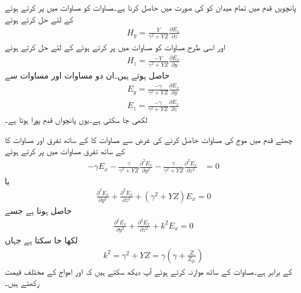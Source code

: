 پانچویں قدم میں تمام میدان کو  کی صورت میں حاصل کرنا ہے۔مساوات  کو مساوات  میں پر کرتے ہوئے   کے لئے حل کرتے ہوئے
\begin{align}
H_y=\frac{Y}{\gamma^2+YZ} \frac{\partial E_x}{\partial z}\label{مساوات_مویج_عرضی_مقناطیسی_برقی_شکل_الف}
\end{align}
اور اسی طرح مساوات  کو مساوات  میں پر کرتے ہوئے   کے لئے حل کرتے ہوئے
\begin{align}
H_z=\frac{-Y}{\gamma^2+YZ} \frac{\partial E_x}{\partial y}\label{مساوات_مویج_عرضی_مقناطیسی_برقی_شکل_ب}
\end{align}
حاصل ہوتے ہیں۔ان دو مساوات اور مساوات  سے 
\begin{align}
E_y=\frac{-\gamma}{\gamma^2+YZ} \frac{\partial E_x}{\partial y} \label{مساوات_مویج_عرضی_مقناطیسی_برقی_شکل_پ}\\
E_z=\frac{-\gamma}{\gamma^2+YZ} \frac{\partial E_x}{\partial z}\label{مساوات_مویج_عرضی_مقناطیسی_برقی_شکل_ت}
\end{align}
لکھی جا سکتی ہے۔یوں پانچواں قدم پورا ہوتا ہے۔

چھٹے قدم میں   موج کی مساوات حاصل کرنے کی غرض سے مساوات  کا  کے ساتھ تفرق اور مساوات  کا  کے ساتھ تفرق مساوات  میں پر کرتے ہوئے  
\begin{align*}
-\gamma E_x-\frac{\gamma}{\gamma^2+YZ}\frac{\partial^2 E_x}{\partial y^2}-\frac{\gamma}{\gamma^2+YZ}\frac{\partial^2 E_x}{\partial z^2}&=0  
\end{align*}
یا
\begin{align*}
\frac{\partial^2 E_x}{\partial y^2}+\frac{\partial^2 E_x}{\partial z^2}+(\gamma^2+YZ)E_x=0  
\end{align*}
حاصل ہوتا ہے جسے
\begin{align}\label{مساوات_مویج_عرضی_مقناطیسی_غیر_سمتی_موج}
\frac{\partial^2 E_x}{\partial y^2}+\frac{\partial^2 E_x}{\partial z^2}+k^2 E_x=0  
\end{align}
لکھا جا سکتا ہے جہاں
\begin{align}\label{مساوات_مویج_عرضی_مقناطیسی_مستقل_قے_الف}
k^2=\gamma^2+YZ=\gamma\left(\gamma+\frac{Z}{Z_{yz}}\right)
\end{align}
کے برابر ہے۔مساوات  کے ساتھ موازنہ کرتے ہوئے آپ دیکھ سکتے ہیں کہ  اور  امواج کے  مختلف قیمت رکھتے ہیں۔

